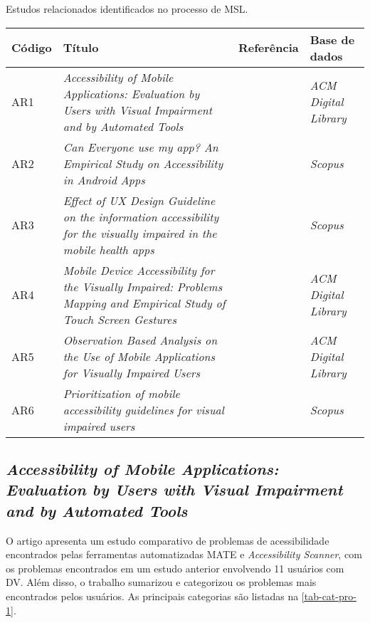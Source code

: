 \begin{quadro}[htb!]
  \caption{\label{qua-art-rev-sis}Estudos relacionados identificados no processo de MSL.}
  \begin{tabular}{|m{1.2cm} | m{8.1cm} | m{2.7cm} | m{2.5cm}|}
    \hline
    \textbf{Código} & \textbf{Título}                                                                                                             & \textbf{Referência}  & \textbf{Base de dados}     \\
    \hline
    AR1             & \emph{Accessibility of Mobile Applications: Evaluation by Users with Visual Impairment and by Automated Tools}              & \cite{Mateus2020}    & \emph{ACM Digital Library} \\
    \hline
    AR2             & \emph{Can Everyone use my app? An Empirical Study on Accessibility in Android Apps}                                         & \cite{Vendome201941} & \emph{Scopus}              \\
    \hline
    AR3             & \emph{Effect of UX Design Guideline on the information accessibility for the visually impaired in the mobile health apps}   & \cite{Kim20191103}   & \emph{Scopus}              \\
    \hline
    AR4             & \emph{Mobile Device Accessibility for the Visually Impaired: Problems Mapping and Empirical Study of Touch Screen Gestures} & \cite{Damaceno2016}  & \emph{ACM Digital Library} \\
    \hline
    AR5             & \emph{Observation Based Analysis on the Use of Mobile Applications for Visually Impaired Users}                             & \cite{Siebra2016}    & \emph{ACM Digital Library} \\
    \hline
    AR6             & \emph{Prioritization of mobile accessibility guidelines for visual impaired users}                                          & \cite{Quispe2020}    & \emph{Scopus}              \\
    \hline
  \end{tabular}
\end{quadro}

\subsection{\emph{Accessibility of Mobile Applications: Evaluation by Users with Visual Impairment and by Automated Tools}}

O artigo apresenta um estudo comparativo de problemas de acessibilidade encontrados pelas ferramentas automatizadas MATE e \emph{Accessibility Scanner}, com os problemas encontrados em um estudo anterior envolvendo 11 usuários com DV\@.
Além disso, o trabalho sumarizou e categorizou os problemas mais encontrados pelos usuários.
As principais categorias são listadas na \autoref{tab-cat-pro-1}.

